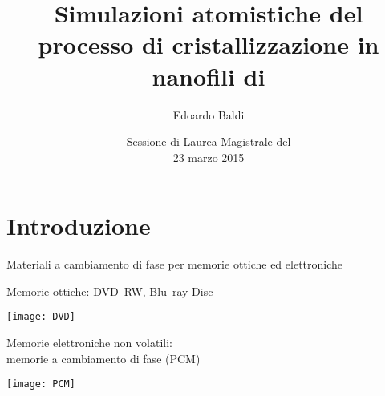 \documentclass{beamer}
\title[Cristallizzazione in nanofili di \gete] %
{Simulazioni atomistiche del processo di cristallizzazione in nanofili di \gete}
\author[Edoardo Baldi] %
{Edoardo Baldi \\\medskip {\small\emph{Relatore:} Prof.~Marco~Bernasconi}}
\institute[Università di Milano--Bicocca]{Università di Milano--Bicocca --- Dipartimento di Fisica}
\date[23 marzo 2015] %
{{\small Sessione di Laurea Magistrale del} \\[3pt] 23 marzo 2015}
\begin{document}
\begin{frame}
  \titlepage
\end{frame}



\section{Introduzione}

\begin{frame}{Materiali a cambiamento di fase per memorie ottiche ed elettroniche}
\begin{minipage}{1.0\textwidth}
  \begin{minipage}[b]{0.53\linewidth}
  Memorie ottiche: {\ev DVD--RW, Blu--ray Disc}
  \end{minipage}
\hfill
  \begin{minipage}[b]{0.43\linewidth}\centering
  \texttt{[image: DVD]}
  \end{minipage}
\end{minipage}
\begin{minipage}{1.0\textwidth}
  \begin{minipage}[b]{0.53\linewidth}
  Memorie elettroniche non volatili:\hfill\\ {\ev memorie a cambiamento di fase} (PCM)
  \end{minipage}
\hfill
  \begin{minipage}[b]{0.43\linewidth}\centering
  \texttt{[image: PCM]}\\
  \end{minipage}
\end{minipage}
\vspace{1cm}\\
\end{frame}
\end{document}

